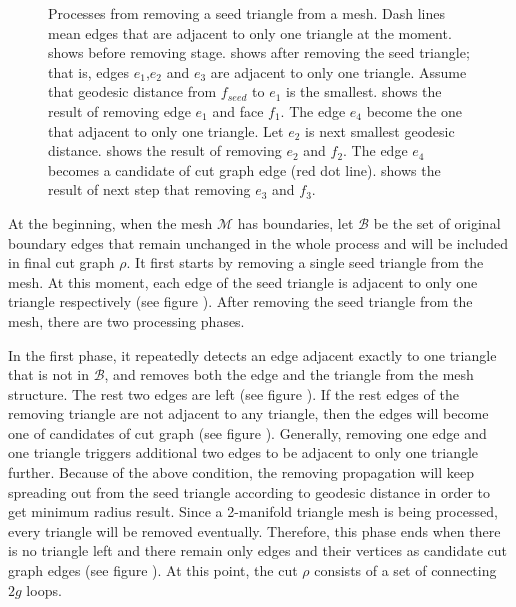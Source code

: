 \documentclass[a4paper,twoside]{article}
\begin{document}
\begin{figure}[t]
	\caption{Processes from removing a seed triangle from a mesh. Dash lines mean edges that are adjacent to only one triangle at the moment.  shows before removing stage.  shows after removing the seed triangle; that is, edges $e_1$,$e_2$ and $e_3$ are adjacent to only one triangle. Assume that geodesic distance from $f_{seed}$ to $e_1$ is the smallest.  shows the result of removing edge $e_1$ and face $f_1$. The edge $e_4$ become the one that adjacent to only one triangle. Let $e_2$ is next smallest geodesic distance.  shows the result of removing $e_2$ and $f_2$. The edge $e_4$ becomes a candidate of cut graph edge (red dot line).  shows the result of next step that removing $e_3$ and $f_3$.}
	\label{fig:OriginalGenusReduceMethodStepByStep}
\end{figure}

At the beginning, when the mesh $\mathscr{M}$ has boundaries, let $\mathscr{B}$  be the set of original boundary edges that remain unchanged in the whole process and will be included in final cut graph ${\rho}$. It first starts by removing a single seed triangle from the mesh. At this moment, each edge of the seed triangle is adjacent to only one triangle respectively (see figure ).  After removing the seed triangle from the mesh, there are two processing phases.

In the first phase, it repeatedly detects an edge adjacent exactly to one triangle that is not in $\mathscr{B}$, and removes both the edge and the triangle from the mesh structure. The rest two edges are left (see figure ). If the rest edges of the removing triangle are not adjacent to any triangle, then the edges will become one of candidates of cut graph (see figure ). Generally, removing one edge and one triangle triggers additional two edges to be adjacent to only one triangle further. Because of the above condition, the removing propagation will keep spreading out from the seed triangle according to geodesic distance in order to get minimum radius result. Since a 2-manifold triangle mesh is being processed, every triangle will be removed eventually. Therefore, this phase ends when there is no triangle left and there remain only edges and their vertices as candidate cut graph edges (see figure ). At this point, the cut $\rho$ consists of a set of connecting $2g$ loops.
\end{document}
